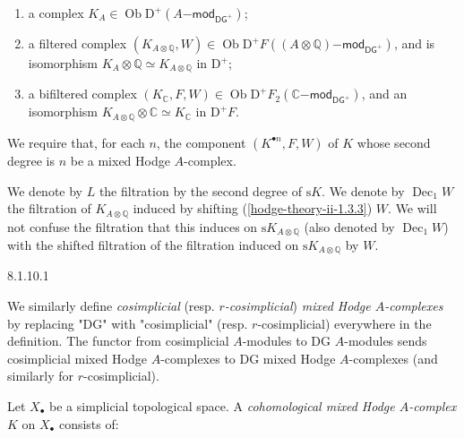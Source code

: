     
 \begin{enumerate}
      
 \item[(a)]
        a complex \(K_A\in \operatorname {Ob}\mathrm {D}^+(A\mathsf {-mod}_{\mathsf {DG}^+})\);
      

      
 \item[(b)]
        a filtered complex \((K_{A\otimes \mathbb {Q}},W)\in \operatorname {Ob}\mathrm {D}^+F((A\otimes \mathbb {Q})\mathsf {-mod}_{\mathsf {DG}^+})\), and is isomorphism \(K_A\otimes \mathbb {Q}\simeq  K_{A\otimes \mathbb {Q}}\) in \(\mathrm {D}^+\);
      

      
 \item[(c)]
        a bifiltered complex \((K_\mathbb {C},F,W)\in \operatorname {Ob}\mathrm {D}^+F_2(\mathbb {C}\mathsf {-mod}_{\mathsf {DG}^+})\), and an isomorphism \(K_{A\otimes \mathbb {Q}}\otimes \mathbb {C}\simeq  K_\mathbb {C}\) in \(\mathrm {D}^+F\).
      

    \end{enumerate}\par{}We require that, for each \(n\), the component \((K^{\bullet  n},F,W)\) of \(K\) whose second degree is \(n\) be a mixed Hodge \(A\)-complex.\par{}We denote by \(L\) the filtration by the second degree of \(\mathrm {s} K\).
    We denote by \(\operatorname {Dec}_1W\) the filtration of \(K_{A\otimes \mathbb {Q}}\) induced by shifting (\cref{hodge-theory-ii-1.3.3}) \(W\).
    We will not confuse the filtration that this induces on \(\mathrm {s} K_{A\otimes \mathbb {Q}}\) (also denoted by \(\operatorname {Dec}_1W\)) with the shifted filtration of the filtration induced on \(\mathrm {s} K_{A\otimes \mathbb {Q}}\) by \(W\).\begin{variant}{8.1.10.1}\label{hodge-theory-iii-8.1.10.1}\skipsinglepar\par{}We similarly define \emph{cosimplicial} (resp. \emph{\(r\)-cosimplicial}) \emph{mixed Hodge \(A\)-complexes} by replacing "DG" with "cosimplicial" (resp. \(r\)-cosimplicial) everywhere in the definition.
      The functor from cosimplicial \(A\)-modules to DG \(A\)-modules sends cosimplicial mixed Hodge \(A\)-complexes to DG mixed Hodge \(A\)-complexes (and similarly for \(r\)-cosimplicial).\end{variant}\label{hodge-theory-iii-8.1.11}\par{}Let \(X_\bullet \) be a simplicial topological space.
    A \emph{cohomological mixed Hodge \(A\)-complex} \(K\) on \(X_\bullet \) consists of:

